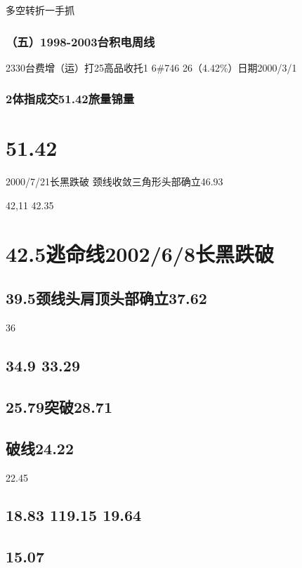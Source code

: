 \documentclass{article}
\begin{document}
\clearpage

多空转折一手抓

\subsubsection{（五）1998-2003台积电周线}

2330台费增（运）打25高品收托1 6\#746 26（4.42\%）日期2000/3/1

\subsubsection{2体指成交51.42旅量锦量}

\section{51.42}

2000/7/21长黑跌破 颈线收敛三角形头部确立46.93

42,11 42.35

\section{42.5逃命线2002/6/8长黑跌破}

\subsection{39.5颈线头肩顶头部确立37.62}

36

\subsection{34.9 33.29}

\subsection{25.79突破28.71}

\subsection{破线24.22}

22.45

\subsection{18.83 119.15 19.64}

\subsection{15.07}
\end{document}
